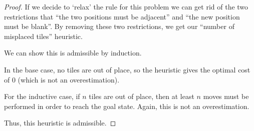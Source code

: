 \documentclass[12pt,letterpaper]{article}
\begin{document}
\begin{enumerate}
\begin{proof}
        If we decide to `relax' the rule for this problem we can get rid of the two restrictions that ``the two positions must be adjacent'' and ``the new position must be blank''.
        By removing these two restrictions, we get our ``number of misplaced tiles'' heuristic.

        We can show this is admissible by induction.

        In the base case, no tiles are out of place, so the heuristic gives the optimal cost of 0 (which is not an overestimation).

        For the inductive case, if $n$ tiles are out of place, then at least $n$ moves must be performed in order to reach the goal state.
        Again, this is not an overestimation.

        Thus, this heuristic is admissible.
      \end{proof}
  \end{enumerate}
\end{document}
